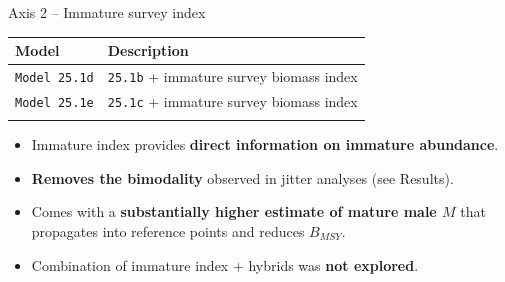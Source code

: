 \documentclass[
  10pt,
  ignorenonframetext,
  aspectratio=169,
]{beamer}
\providecommand{\tightlist}{%
  \setlength{\itemsep}{0pt}\setlength{\parskip}{0pt}}
\begin{document}
\begin{frame}[fragile]{Axis 2 -- Immature survey index}
\label{axis-2-immature-survey-index}
\small

\begin{longtable}[]{@{}ll@{}}
\toprule\noalign{}
Model & Description \\
\midrule\noalign{}
\endhead
\texttt{Model\ 25.1d} & \texttt{25.1b} + immature survey biomass
index \\
\texttt{Model\ 25.1e} & \texttt{25.1c} + immature survey biomass
index \\
\bottomrule\noalign{}
\end{longtable}

\medskip

\begin{itemize}
\tightlist
\item
  Immature index provides \textbf{direct information on immature
  abundance}.
\item
  \textbf{Removes the bimodality} observed in jitter analyses (see
  Results).
\item
  Comes with a \textbf{substantially higher estimate of mature male
  \(M\)} that propagates into reference points and reduces \(B_{MSY}\).
\item
  Combination of immature index + hybrids was \textbf{not explored}.
\end{itemize}
\end{frame}
\end{document}
